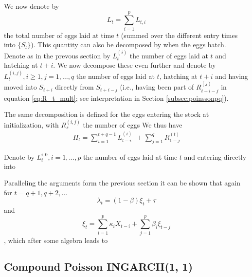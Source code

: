 \documentclass{article}
\begin{document}
We now denote by
$$
L_t = \sum_{i = 1}^p L_{t, i}
$$
the total number of eggs laid at time $t$ (summed over the different entry times into $\{S_t\}$). This quantity can also be decomposed by when the eggs hatch. Denote as in the prevous section by $L_t^{(i)}$ the number of eggs laid at $t$ and hatching at $t + i$. We now decompose these even further and denote by $L_t^{(i, j)}, i \geq 1, j = 1, \dots, q$ the number of eggs laid at $t$, hatching at $t + i$ and having moved into $S_{t + i}$ directly from $S_{t + i - j}$ (i.e., having been part of $R_{t + i - j}^{(j)}$ in equation \eqref{eq:R_t_mult}; see interpretation in Section \ref{subsec:poinssonpq}).

The same decomposition is defined for the eggs entering the stock at initialization, with $R_s^{(i, j)}$ the number of eggs We thus have
\begin{align*}
H_t = \sum_{i = 1}^{t + q - 1} L^{(i)}_{t - i} \ \ + \sum_{j = 1}^q R_{1 - j}^{(t)}
\end{align*}

 Denote by $L_t^{i, 0}, i= 1, \dots, p$ the number of eggs laid at time $t$ and entering directly into

Paralleling the arguments form the previous section it can be shown that again for $t = q + 1, q + 2, \dots$
\begin{equation}
\lambda_t = (1 - \beta)\xi_t + \tau
\end{equation}
and
\begin{equation}
\xi_t = \sum_{i = 1}^p \kappa_i X_{t - i} + \sum_{j = 1}^p \beta_i\xi_{t - j}
\end{equation},
which after some algebra leads to


\subsection{Compound Poisson INGARCH(1, 1)}
\end{document}
